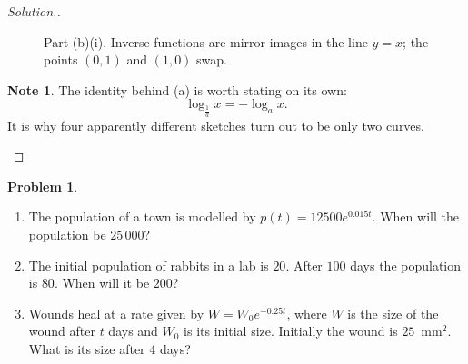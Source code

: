 \documentclass[11pt,a4paper]{article}
\theoremstyle{definition}
\newtheorem{note}[thm]{Note}
\newtheorem{problemx}{Problem}[section]
\newenvironment{problem}{\begin{problemx}}{\end{problemx}}
\newenvironment{solution}
  {\renewcommand{\qedsymbol}{}\begin{proof}[\textit{Solution}.]}
  {\end{proof}}
\begin{document}
\begin{solution}
\begin{figure}[H]
\centering
{}
\caption{Part (b)(i). Inverse functions are mirror images in the line $y=x$; the points $(0,1)$ and $(1,0)$ swap.}
\end{figure}

\begin{note}
The identity behind (a) is worth stating on its own:
$$\log_{\frac{1}{a}}x=-\log_a x.$$
It is why four apparently different sketches turn out to be only two curves.
\end{note}
\end{solution}

\begin{problem}
\begin{enumerate}
\item[(a).] The population of a town is modelled by $p(t)=12500e^{0.015t}$. When will
the population be $25\,000$?
\item[(b).] The initial population of rabbits in a lab is $20$. After $100$ days the
population is $80$. When will it be $200$?
\item[(c).] Wounds heal at a rate given by $W=W_0e^{-0.25t}$, where $W$ is the size of
the wound after $t$ days and $W_0$ is its initial size. Initially the wound is
$25$~mm$^2$. What is its size after $4$ days?
\end{enumerate}
\end{problem}
\end{document}
